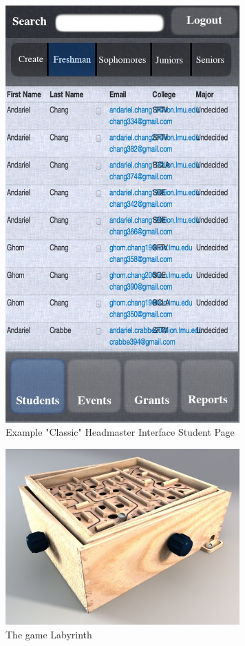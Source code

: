 \documentclass{article}
\begin{document}
\begin{figure}[ht!]
\centering
\includegraphics[width=90mm]{classic-students.jpg}
\caption{Example "Classic" Headmaster Interface Student Page}
\label{overflow}
\end{figure}

\begin{figure}[ht!]
\centering
\includegraphics[width=90mm]{labyrinth.jpeg}
\caption{The game Labyrinth}
\label{overflow}
\end{figure}
\end{document}
